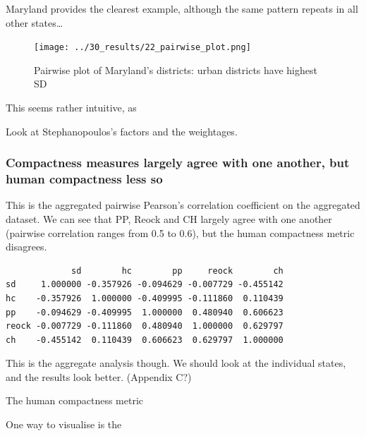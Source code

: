 \documentclass[]{article}
\begin{document}
Maryland provides the clearest example, although the same pattern
repeats in all other states\ldots{}

\begin{figure}
\centering
\texttt{[image: ../30\_results/22\_pairwise\_plot.png]}
\caption{Pairwise plot of Maryland's districts: urban districts have
highest SD}
\end{figure}

This seems rather intuitive, as

Look at Stephanopoulos's factors and the weightages.

\hypertarget{compactness-measures-largely-agree-with-one-another-but-human-compactness-less-so}{%
\subsubsection{Compactness measures largely agree with one another, but
human compactness less
so}\label{compactness-measures-largely-agree-with-one-another-but-human-compactness-less-so}}

This is the aggregated pairwise Pearson's correlation coefficient on the
aggregated dataset. We can see that PP, Reock and CH largely agree with
one another (pairwise correlation ranges from 0.5 to 0.6), but the human
compactness metric disagrees.

\begin{verbatim}
             sd        hc        pp     reock        ch
sd     1.000000 -0.357926 -0.094629 -0.007729 -0.455142
hc    -0.357926  1.000000 -0.409995 -0.111860  0.110439
pp    -0.094629 -0.409995  1.000000  0.480940  0.606623
reock -0.007729 -0.111860  0.480940  1.000000  0.629797
ch    -0.455142  0.110439  0.606623  0.629797  1.000000
\end{verbatim}

This is the aggregate analysis though. We should look at the individual
states, and the results look better. (Appendix C?)

The human compactness metric

One way to visualise is the
\end{document}
